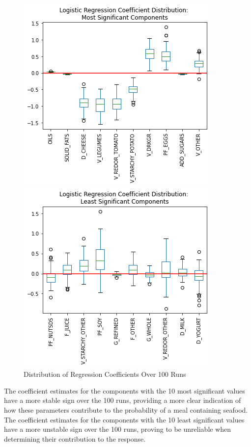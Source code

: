 \documentclass{article}
\begin{document}
\begin{figure}[htb]
\begin{minipage}[b]{.48\linewidth}
  \centering
  \centerline{\includegraphics[scale=0.3]{Coeff_Est_Top10_P.png}}
\end{minipage}
\hfill
\begin{minipage}[b]{0.48\linewidth}
  \centering
  \centerline{\includegraphics[scale=0.3]{Coeff_Est_Tail10_P.png}}
\end{minipage}
\caption{Distribution of Regression Coefficients Over 100 Runs}
\label{fig:res}
\end{figure}

The coefficient estimates for the components with the 10 most significant values have a more stable sign over the 100 runs, providing a more clear indication of how these parameters contribute to the probability of a meal containing seafood. The coefficient estimates for the components with the 10 least significant values have a more unstable sign over the 100 runs, proving to be unreliable when determining their contribution to the response. 
\end{document}
